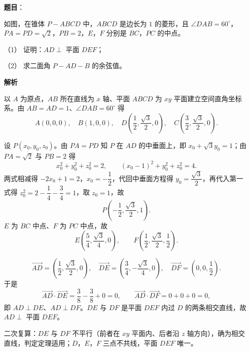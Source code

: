 \begin{answer}

\textbf{题目}：

如图，在锥体 $P-ABCD$ 中，$ABCD$ 是边长为 $1$ 的菱形，且 $\angle DAB=60^\circ$，$PA=PD=\sqrt2$，$PB=2$，$E$，$F$ 分别是 $BC$，$PC$ 的中点。

（1） 证明：$AD\perp$ 平面 $DEF$；

（2） 求二面角 $P-AD-B$ 的余弦值。
\nopagebreak[4]
\begin{center}\end{center}
\nopagebreak[4]
\textbf{解析}

以 $A$ 为原点，$AB$ 所在直线为 $x$ 轴、平面 $ABCD$ 为 $xy$ 平面建立空间直角坐标系。由 $AB=AD=1$、$\angle DAB=60^\circ$ 得
\nopagebreak[4]
\[A(0,0,0),\quad B(1,0,0),\quad D\left(\frac12,\frac{\sqrt3}{2},0\right),\quad C\left(\frac32,\frac{\sqrt3}{2},0\right).\]

设 $P(x_0,y_0,z_0)$。由 $PA=PD$ 知 $P$ 在 $AD$ 的中垂面上，即 $x_0+\sqrt3y_0=1$；由 $PA=\sqrt2$ 与 $PB=2$ 得
\nopagebreak[4]
\[x_0^2+y_0^2+z_0^2=2,\qquad (x_0-1)^2+y_0^2+z_0^2=4.\]
两式相减得 $-2x_0+1=2$，$x_0=-\dfrac12$，代回中垂面方程得 $y_0=\dfrac{\sqrt3}{2}$，再代入第一式得 $z_0^2=2-\dfrac14-\dfrac34=1$，取 $z_0=1$，故
\nopagebreak[4]
\[P\left(-\frac12,\frac{\sqrt3}{2},1\right).\]
$E$ 为 $BC$ 中点、$F$ 为 $PC$ 中点，故
\nopagebreak[4]
\[E\left(\frac54,\frac{\sqrt3}{4},0\right),\qquad F\left(\frac12,\frac{\sqrt3}{2},\frac12\right).\]

\nopagebreak[4]
\[\overrightarrow{AD}=\left(\frac12,\frac{\sqrt3}{2},0\right),\quad \overrightarrow{DE}=\left(\frac34,-\frac{\sqrt3}{4},0\right),\quad \overrightarrow{DF}=\left(0,0,\frac12\right).\]
于是
\nopagebreak[4]
\[\overrightarrow{AD}\cdot\overrightarrow{DE}=\frac38-\frac38+0=0,\qquad \overrightarrow{AD}\cdot\overrightarrow{DF}=0+0+0=0,\]
即 $AD\perp DE$、$AD\perp DF$。$DE$ 与 $DF$ 是平面 $DEF$ 内过 $D$ 的两条相交直线，故 $AD\perp$ 平面 $DEF$。

二次复算：$DE$ 与 $DF$ 不平行（前者在 $xy$ 平面内、后者沿 $z$ 轴方向），确为相交直线，判定定理适用；$D$，$E$，$F$ 三点不共线，平面 $DEF$ 唯一。


\end{answer}
